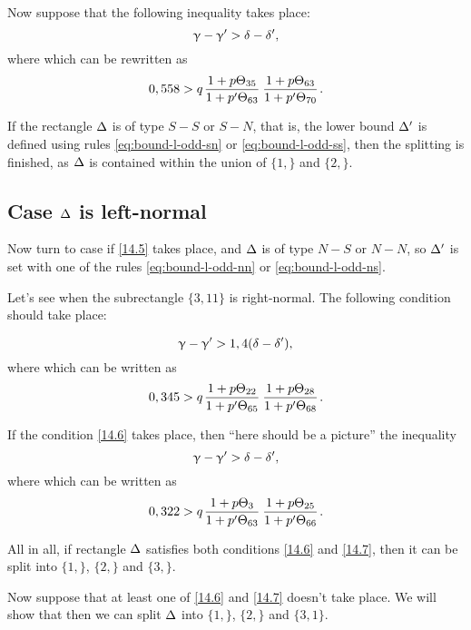 Now suppose that the following inequality takes place:
\begin{equation*}
	\upgamma - \upgamma' > \delta - \delta',
\end{equation*}
where
which can be rewritten as
\begin{equation}\label{14.5}
	0,558 > q \up{35}{63} \up{63}{70}.
\end{equation}

If the rectangle $\Delta$ is of type $S-S$ or $S-N$,
that is, the lower bound $\Delta'$ is defined using rules \ref{eq:bound-l-odd-sn} or \ref{eq:bound-l-odd-ss},
then the splitting is finished, as $\Delta$ is contained within the union of $\{1,\}$ and $\{2,\}$.


\subsection{Case $\Delta$ is left-normal}

Now turn to case if \ref{14.5} takes place,
and $\Delta$ is of type $N-S$ or $N-N$,
so $\Delta'$ is set with one of the rules \ref{eq:bound-l-odd-nn} or \ref{eq:bound-l-odd-ns}.

Let's see when the subrectangle $\{3, 11\}$ is right-normal.
The following condition should take place:

\begin{equation*}
	\upgamma - \upgamma' > 1,4 (\delta - \delta'),
\end{equation*}
where
which can be written as
\begin{equation}\label{14.6}
	0,345 > q \up{22}{65} \up{28}{68}.
\end{equation}

If the condition \ref{14.6} takes place, then ``here should be a picture''
the inequality
\begin{equation*}
	\upgamma - \upgamma' > \delta - \delta',
\end{equation*}
where
which can be written as
\begin{equation}\label{14.7}
	0,322 > q \up{3}{63} \up{25}{66}.
\end{equation}

All in all, if rectangle $\Delta$ satisfies both conditions \ref{14.6} and \ref{14.7},
then it can be split into $\{1,\}$, $\{2,\}$ and $\{3,\}$.

Now suppose that at least one of \ref{14.6} and \ref{14.7} doesn't take place.
We will show that then we can split $\Delta$ into $\{1,\}$, $\{2,\}$ and $\{3,1\}$.

